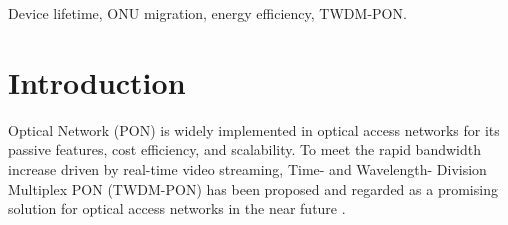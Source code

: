 \documentclass[letter]{IEEEtran}
\begin{document}
\begin{IEEEkeywords}
Device lifetime, ONU migration, energy efficiency, TWDM-PON.
\end{IEEEkeywords}






%
\IEEEpeerreviewmaketitle

\vspace{-4.0mm}

\section{Introduction}
% 
% 
% 
% 
 Optical Network (PON) is widely implemented in optical access networks for its passive features, cost efficiency, and scalability. To meet the rapid bandwidth increase driven by real-time video streaming, Time- and Wavelength- Division Multiplex PON (TWDM-PON) has been proposed and regarded as a promising solution for optical access networks in the near future \cite{6289432}.
\end{document}

